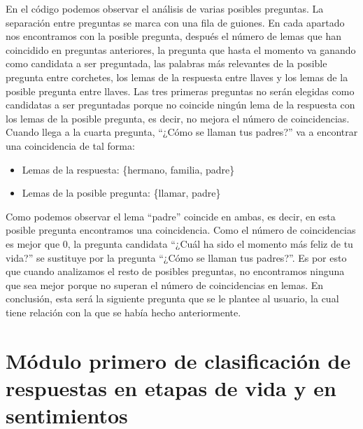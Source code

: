 En el código podemos observar el análisis de varias posibles preguntas. La separación entre preguntas se marca con una fila de guiones. En cada apartado nos encontramos con la posible pregunta, después el número de lemas que han coincidido en preguntas anteriores, la pregunta que hasta el momento va ganando como candidata a ser preguntada, las palabras más relevantes de la posible pregunta entre corchetes, los lemas de la respuesta entre llaves y los lemas de la posible pregunta entre llaves. Las tres primeras preguntas no serán elegidas como candidatas a ser preguntadas porque no coincide ningún lema de la respuesta con los lemas de la posible pregunta, es decir, no mejora el número de coincidencias. Cuando llega a la cuarta pregunta, ``¿Cómo se llaman tus padres?'' va a encontrar una coincidencia de tal forma:

\begin{itemize}
	\item[] Lemas de la respuesta: \hspace{2cm} \{hermano, familia, padre\} 
	\item[] Lemas de la posible pregunta: \hspace{0.8cm} \{llamar, padre\}
\end{itemize}

Como podemos observar el lema ``padre'' coincide en ambas, es decir, en esta posible pregunta encontramos una coincidencia. Como el número de coincidencias es mejor que 0, la pregunta candidata ``¿Cuál ha sido el momento más feliz de tu vida?'' se sustituye por la pregunta ``¿Cómo se llaman tus padres?''. Es por esto que cuando analizamos el resto de posibles preguntas, no encontramos ninguna que sea mejor porque no superan el número de coincidencias en lemas. En conclusión, esta será la siguiente pregunta que se le plantee al usuario, la cual tiene relación con la que se había hecho anteriormente. 

\section{Módulo primero de clasificación de respuestas en etapas de vida y en sentimientos}




